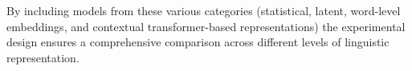 \documentclass[\myFontSize,oneside,english,hidelinks,a4paper]{article}
\begin{document}
\begin{enumerate}
\end{enumerate}


By including models from these various categories (statistical, latent, word-level embeddings, and contextual transformer-based representations) the experimental design ensures a comprehensive comparison across different levels of linguistic representation.


%
%
%
%
%
\end{document}
